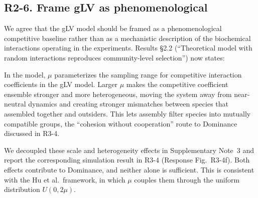 \subsection*{R2-6. Frame gLV as phenomenological}


\responselabel
We agree that the gLV model should be framed as a phenomenological competitive baseline rather than as a mechanistic description of the biochemical interactions operating in the experiments. Results \S2.2 (``Theoretical model with random interactions reproduces community-level selection'') now states: 


\responselabel
In the model, $\mu$ parameterizes the sampling range for competitive interaction coefficients in the gLV model. Larger $\mu$ makes the competitive coefficient ensemble stronger and more heterogeneous, moving the system away from near-neutral dynamics and creating stronger mismatches between species that assembled together and outsiders. This lets assembly filter species into mutually compatible groups, the ``cohesion without cooperation'' route to Dominance discussed in R3-4.

We decoupled these scale and heterogeneity effects in Supplementary Note~3 and report the corresponding simulation result in R3-4 (Response Fig.~R3-4f). Both effects contribute to Dominance, and neither alone is sufficient. This is consistent with the Hu et al.\ framework, in which $\mu$ couples them through the uniform distribution $U(0, 2\mu)$.

